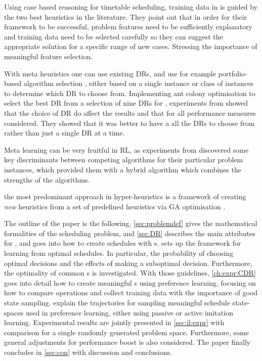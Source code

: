 \documentclass[smallextended]{svjour3}
\begin{document}
Using case based reasoning for timetable scheduling, training data in 
\cite{Burke06} is guided by the two best heuristics in the literature.
They point out that in order for their framework to be successful, problem 
features need to be sufficiently explanatory and training data need to be 
selected carefully so they can suggest the appropriate solution for a specific 
range of new cases. Stressing the importance of meaningful feature selection. 


With meta heuristics one can use existing DRs, and use for example 
portfolio-based algorithm selection \cite{Rice76,Gomes01}, either based on a 
single instance or class of instances \cite{Xu07} to determine which DR to 
choose from. 
Implementing ant colony optimisation to select the best DR 
from a selection of nine DRs for \JSP, experiments from \cite{Korytkowski13} 
showed that the choice of DR do affect the results and that for all performance 
measures considered. They showed that it was better to have a all the DRs to 
choose from rather than just a single DR at a time.

Meta learning can be very fruitful in RL, as experiments from 
\cite{Kalyanakrishnan11} discovered some key discriminants between 
competing algorithms for their particular problem instances, which provided 
them with a hybrid algorithm which combines the strengths of the algorithms.


the most predominant approach in hyper-heuristics is a framework of creating 
\emph{new} heuristics from a set of  predefined heuristics via GA optimisation 
\cite{Burke10}. 


The outline of the paper is the following, \cref{sec:problemdef} gives the 
mathematical formalities of the scheduling problem, and  
\cref{sec:DR} describes the main attributes for \jsp, 
and goes into how to create schedules with \dr s. 
 sets up the framework for learning from optimal schedules. 
In particular, the probability of choosing optimal decisions and the effects of 
making a suboptimal decision. Furthermore, the optimality of common \sdr s is 
investigated.
With those guidelines, \cref{ch:expr:CDR} goes into detail how to create 
meaningful \cdr s using preference learning, focusing on how to 
compare operations and collect training data with the importance of good state 
sampling. 
 explain the trajectories for 
sampling meaningful schedule state-spaces used in preference learning, either 
using passive or active imitation learning. 
Experimental results are jointly presented in \cref{sec:il:expr} with 
comparison for a single randomly generated problem space. Furthermore, some 
general adjustments for performance boost is also considered.
The paper finally concludes in \cref{sec:con} with discussion and conclusions.
\end{document}
